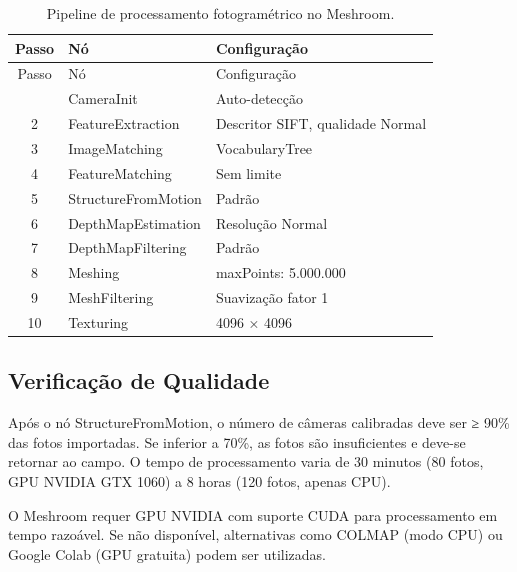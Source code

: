 \documentclass[
  portuguese,
  11pt,
  a4paper,
  open=any]{scrbook}
\begin{document}
\begin{longtable}[]{@{}cll@{}}
\caption{Pipeline de processamento fotogramétrico no
Meshroom.}\label{tbl-pipeline-meshroom}\tabularnewline
\toprule\noalign{}
Passo & Nó & Configuração \\
\midrule\noalign{}
\endfirsthead
\toprule\noalign{}
Passo & Nó & Configuração \\
\midrule\noalign{}
\endhead
\bottomrule\noalign{}
\endlastfoot
1 & CameraInit & Auto-detecção \\
2 & FeatureExtraction & Descritor SIFT, qualidade Normal \\
3 & ImageMatching & VocabularyTree \\
4 & FeatureMatching & Sem limite \\
5 & StructureFromMotion & Padrão \\
6 & DepthMapEstimation & Resolução Normal \\
7 & DepthMapFiltering & Padrão \\
8 & Meshing & maxPoints: 5.000.000 \\
9 & MeshFiltering & Suavização fator 1 \\
10 & Texturing & 4096 × 4096 \\
\end{longtable}

\subsection{Verificação de
Qualidade}\label{verificauxe7uxe3o-de-qualidade}

Após o nó StructureFromMotion, o número de câmeras calibradas deve ser ≥
90\% das fotos importadas. Se inferior a 70\%, as fotos são
insuficientes e deve-se retornar ao campo. O tempo de processamento
varia de 30 minutos (80 fotos, GPU NVIDIA GTX 1060) a 8 horas (120
fotos, apenas CPU).

\begin{tcolorbox}[enhanced jigsaw, leftrule=.75mm, colframe=quarto-callout-warning-color-frame, colback=white, bottomrule=.15mm, opacityback=0, colbacktitle=quarto-callout-warning-color!10!white, breakable, bottomtitle=1mm, opacitybacktitle=0.6, title=\textcolor{quarto-callout-warning-color}{\faExclamationTriangle}\hspace{0.5em}{Requisito de Hardware}, titlerule=0mm, toprule=.15mm, toptitle=1mm, rightrule=.15mm, left=2mm, arc=.35mm, coltitle=black]

O Meshroom requer GPU NVIDIA com suporte CUDA para processamento em
tempo razoável. Se não disponível, alternativas como COLMAP (modo CPU)
ou Google Colab (GPU gratuita) podem ser utilizadas.

\end{tcolorbox}
\end{document}
